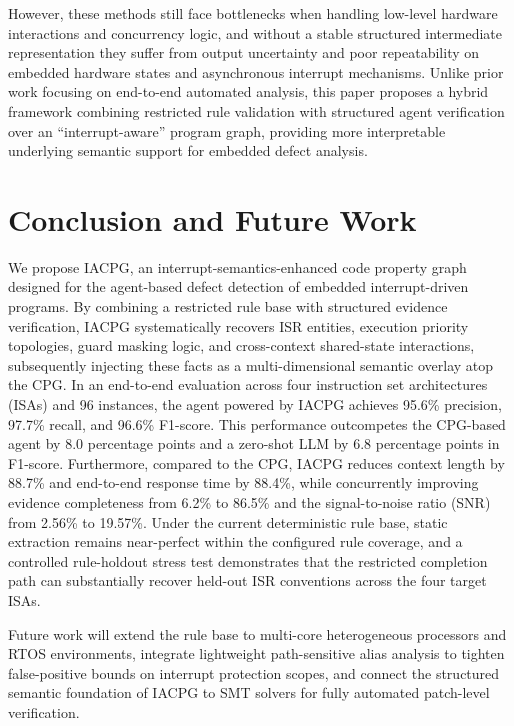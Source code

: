 \documentclass[conference]{IEEEtran}
\begin{document}
However, these methods still face bottlenecks when handling low-level hardware interactions and concurrency logic, and without a stable structured intermediate representation they suffer from output uncertainty and poor repeatability on embedded hardware states and asynchronous interrupt mechanisms. Unlike prior work focusing on end-to-end automated analysis, this paper proposes a hybrid framework combining restricted rule validation with structured agent verification over an ``interrupt-aware'' program graph, providing more interpretable underlying semantic support for embedded defect analysis.


\section{Conclusion and Future Work}

We propose IACPG, an interrupt-semantics-enhanced code property graph designed for the agent-based defect detection of embedded interrupt-driven programs. By combining a restricted rule base with structured evidence verification, IACPG systematically recovers ISR entities, execution priority topologies, guard masking logic, and cross-context shared-state interactions, subsequently injecting these facts as a multi-dimensional semantic overlay atop the CPG. In an end-to-end evaluation across four instruction set architectures (ISAs) and 96 instances, the agent powered by IACPG achieves 95.6\% precision, 97.7\% recall, and 96.6\% F1-score. This performance outcompetes the CPG-based agent by 8.0 percentage points and a zero-shot LLM by 6.8 percentage points in F1-score. Furthermore, compared to the CPG, IACPG reduces context length by 88.7\% and end-to-end response time by 88.4\%, while concurrently improving evidence completeness from 6.2\% to 86.5\% and the signal-to-noise ratio (SNR) from 2.56\% to 19.57\%. Under the current deterministic rule base, static extraction remains near-perfect within the configured rule coverage, and a controlled rule-holdout stress test demonstrates that the restricted completion path can substantially recover held-out ISR conventions across the four target ISAs.

Future work will extend the rule base to multi-core heterogeneous processors and RTOS environments, integrate lightweight path-sensitive alias analysis to tighten false-positive bounds on interrupt protection scopes, and connect the structured semantic foundation of IACPG to SMT solvers for fully automated patch-level verification.





\end{document}
